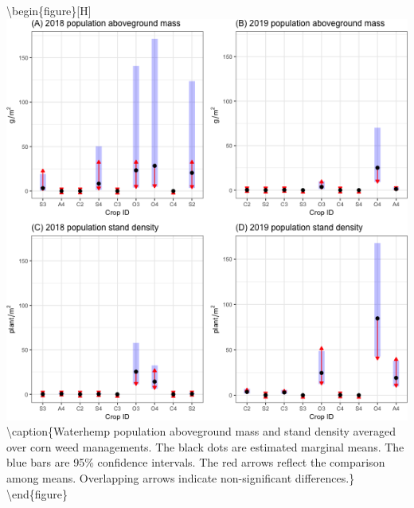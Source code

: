 \documentclass[
]{article}
\begin{document}
\textbackslash begin\{figure\}{[}H{]}
\includegraphics[width=1\linewidth]{Manuscript_whole_files/figure-latex/pop-biom-dens-all-1} \textbackslash caption\{Waterhemp population aboveground mass and stand density averaged over corn weed managements. The black dots are estimated marginal means. The blue bars are 95\% confidence intervals. The red arrows reflect the comparison among means. Overlapping arrows indicate non-significant differences.\}\label{fig:pop-biom-dens-all}
\textbackslash end\{figure\}
\end{document}
